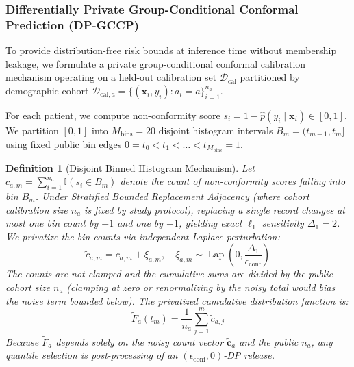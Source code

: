 \documentclass[pdflatex,sn-vancouver-num,referee,lineno]{sn-jnl}
\theoremstyle{thmstyleone}
\theoremstyle{thmstylethree}
\newtheorem{definition}{Definition}
\begin{document}
\subsubsection{Differentially Private Group-Conditional Conformal Prediction (DP-GCCP)}
\label{sec:dp_gccp}

To provide distribution-free risk bounds at inference time without membership leakage, we formulate a private group-conditional conformal calibration mechanism operating on a held-out calibration set $\mathcal{D}_{\text{cal}}$ partitioned by demographic cohort $\mathcal{D}_{\text{cal}, a} = \{(\mathbf{x}_i, y_i) : a_i = a\}_{i=1}^{n_a}$.

For each patient, we compute non-conformity score $s_i = 1 - \hat{p}(y_i \mid \mathbf{x}_i) \in [0, 1]$. We partition $[0, 1]$ into $M_{\text{bins}} = 20$ disjoint histogram intervals $B_m = (t_{m-1}, t_m]$ using fixed public bin edges $0 = t_0 < t_1 < \dots < t_{M_{\text{bins}}} = 1$.

\begin{definition}[Disjoint Binned Histogram Mechanism]
Let $c_{a, m} = \sum_{i=1}^{n_a} \mathbb{I}(s_i \in B_m)$ denote the count of non-conformity scores falling into bin $B_m$. Under Stratified Bounded Replacement Adjacency (where cohort calibration size $n_a$ is fixed by study protocol), replacing a single record changes at most one bin count by $+1$ and one by $-1$, yielding exact $\ell_1$ sensitivity $\Delta_1 = 2$. We privatize the bin counts via independent Laplace perturbation:
\begin{equation}
    \tilde{c}_{a, m} = c_{a, m} + \xi_{a, m}, \quad \xi_{a, m} \sim \operatorname{Lap}\left(0, \frac{\Delta_1}{\epsilon_{\text{conf}}}\right)
\end{equation}
The counts are not clamped and the cumulative sums are divided by the public cohort size $n_a$ (clamping at zero or renormalizing by the noisy total would bias the noise term bounded below). The privatized cumulative distribution function is:
\begin{equation}
    \widetilde{F}_a(t_m) = \frac{1}{n_a}\sum_{j=1}^m \tilde{c}_{a, j}
\end{equation}
Because $\widetilde{F}_a$ depends solely on the noisy count vector $\tilde{\mathbf{c}}_a$ and the public $n_a$, any quantile selection is post-processing of an $(\epsilon_{\text{conf}}, 0)$-DP release.
\end{definition}
\end{document}
